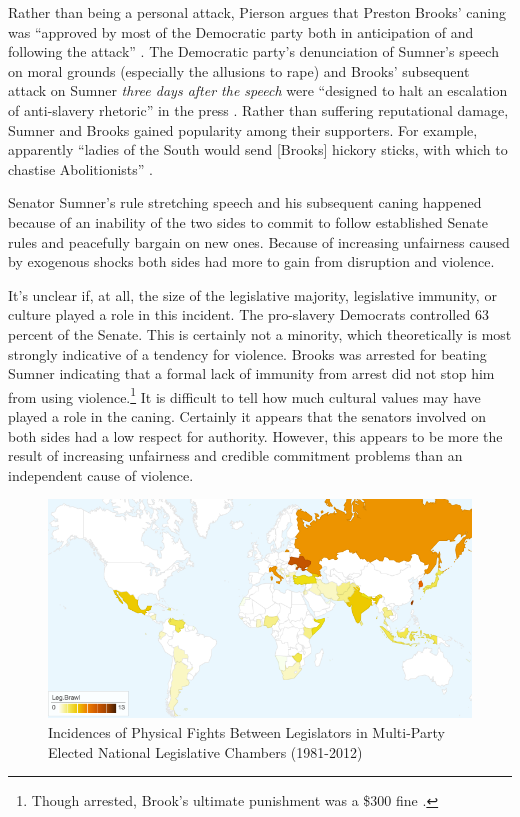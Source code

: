 \documentclass[a4paper]{article}\usepackage[]{graphicx}\usepackage[]{color}
\begin{document}
Rather than being a personal attack, Pierson argues that Preston Brooks' caning was ``approved by most of the Democratic party both in anticipation of and following the attack'' \cite[553]{Pierson1995}. The Democratic party's denunciation of Sumner's speech on moral grounds (especially the allusions to rape) and Brooks' subsequent attack on Sumner \emph{three days after the speech} were ``designed to halt an escalation of anti-slavery rhetoric'' in the press \cite[553]{Pierson1995}. Rather than suffering reputational damage, Sumner and Brooks gained popularity among their supporters. For example, apparently ``ladies of the South would send [Brooks] hickory sticks, with which to chastise Abolitionists'' \cite[255]{Donald2009}.

Senator Sumner's rule stretching speech and his subsequent caning happened because of an inability of the two sides to commit to follow established Senate rules and peacefully bargain on new ones. Because of increasing unfairness caused by exogenous shocks both sides had more to gain from disruption and violence.

It's unclear if, at all, the size of the legislative majority, legislative immunity, or culture played a role in this incident. The pro-slavery Democrats controlled 63 percent of the Senate. This is certainly not a minority, which theoretically is most strongly indicative of a tendency for violence. Brooks was arrested for beating Sumner indicating that a formal lack of immunity from arrest did not stop him from using violence.\footnote{Though arrested, Brook's ultimate punishment was a \$300 fine \cite[59]{Wolfe2004}.} It is difficult to tell how much cultural values may have played a role in the caning. Certainly it appears that the senators involved on both sides had a low respect for authority. However, this appears to be more the result of increasing unfairness and credible commitment problems than an independent cause of violence.

\begin{figure}[h!]
    \centering

        \includegraphics[width = 13cm]{incidence_map.png}

        \caption{Incidences of Physical Fights Between Legislators in Multi-Party Elected National Legislative Chambers (1981-2012)}
        \label{leg_map}

\end{figure}
\end{document}
